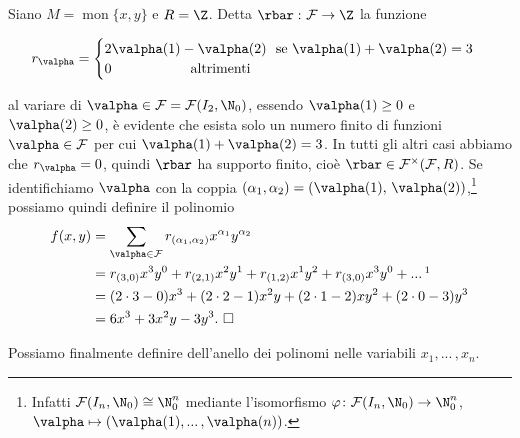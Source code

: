 \begin{exm}Siano $M=\operatorname{mon}\{x,y\}$ e $R=\Z$. Detta $\rbar\,\colon \mathcal{F}\to \Z$ la funzione 
    
  \[r_{\valpha} = \begin{cases}2\valpha(1)-\valpha(2) \text{ \ se } \valpha(1)+\valpha(2)=3 \\ 0 \text{ \ \ \ \ \ \ \ \ \ \ \ \ \ \ \ \ altrimenti}\end{cases}\] 

  \noindent al variare di $\valpha\in\mathcal{F}= \mathcal{F}(I_2,\N_0)$, essendo $\valpha(1)\geq 0$ e $\valpha(2)\geq 0$, 
  è evidente che esista solo un numero finito di funzioni $\valpha\in \mathcal{F}$ per cui $\valpha(1)+\valpha(2)=3$. 
  In tutti gli altri casi abbiamo che $r_{\valpha}=0$, quindi $\rbar$ ha supporto finito, cioè $\rbar\in\mathcal{F}^{\times}(\mathcal{F},R)$. 
  Se identifichiamo $\valpha$ con la coppia $(\alpha_1,\alpha_2)=(\valpha(1),\,\valpha(2))$,\footnote{
  Infatti $\mathcal{F}(I_n,\N_0)\cong \N_0^n$ mediante l'isomorfismo 
  $\varphi\colon \mathcal{F}(I_n,\N_0)\to \N_0^n$, $\valpha \mapsto (\valpha(1),...\,,\valpha(n))$.} 
  possiamo quindi definire il polinomio 
  \begin{align*}
    f(x,y) &= \sum\limits_{\valpha\in \mathcal{F}}r_{(\alpha_1,\alpha_2)} x^{\alpha_1}y^{\alpha_2} \\
    &= r_{(3,0)}x^3y^0+r_{(2,1)}x^2y^1+r_{(1,2)}x^1y^2+r_{(3,0)}x^3y^0+...\,\footnotemark \\ 
    &= (2\cdot 3-0)x^3+(2\cdot 2-1)x^2y+(2\cdot 1-2)xy^2+(2\cdot 0-3)y^3 \\ &= 6x^3+3x^2y-3y^3.\ \square
  \end{align*}
\end{exm}

\noindent Possiamo finalmente definire dell'anello dei polinomi nelle variabili $x_1,...\,,x_n$. 

